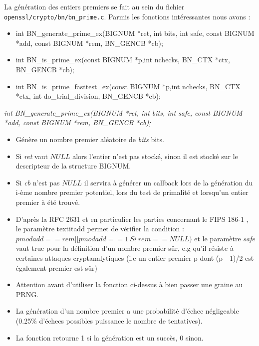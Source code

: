 			La génération des entiers premiers se fait au sein du fichier \texttt{openssl/crypto/bn/bn\_prime.c}. Parmis les fonctions intéressantes nous avons :
			\begin{itemize}
			\item int BN\_generate\_prime\_ex(BIGNUM *ret, int bits, int safe, const BIGNUM *add, const BIGNUM *rem, BN\_GENCB *cb);
			\item int BN\_is\_prime\_ex(const BIGNUM *p,int nchecks, BN\_CTX *ctx, BN\_GENCB *cb);
			\item int BN\_is\_prime\_fasttest\_ex(const BIGNUM *p,int nchecks, BN\_CTX *ctx, int do\_trial\_division, BN\_GENCB *cb);\\
			\end{itemize}

			\textit{int BN\_generate\_prime\_ex(BIGNUM *ret, int bits, int safe, const BIGNUM *add, const BIGNUM *rem, BN\_GENCB *cb);}  
			\begin{itemize}
			\item Génère un nombre premier aléatoire de \textit{bits} bits. 
			\item Si \textit{ret} vaut $NULL$ alors l'entier n'est pas stocké, sinon il est stocké sur le descripteur de la structure BIGNUM.
			\item Si \textit{cb} n'est pas $NULL$ il servira à générer un callback lors de la génération du i-ème nombre premier potentiel, lors du test de primalité et lorsqu'un entier premier à été trouvé.
			\item D'après la RFC 2631 \cite{rfc2631} et en particulier les parties concernant le FIPS 186-1 \cite{fips186-1}, le paramètre textit{add} permet de vérifier la condition : $p mod add == rem || p mod add == 1 \ Si\ rem == NULL)$ et le paramètre \textit{safe} vaut true pour la définition d'un nombre premier sûr, e.g qu'il résiste à certaines attaques cryptanalytiques (i.e un entier premier p dont (p - 1)/2 est également premier est sûr)
			\item Attention avant d'utiliser la fonction ci-dessus à bien passer une graine au PRNG.
			\item La génération d'un nombre premier a une probabilité d'échec négligeable (0.25\% d'échecs possibles puissance le nombre de tentatives).
			\item La fonction retourne 1 si la génération est un succès, 0 sinon.\\
			\end{itemize}

